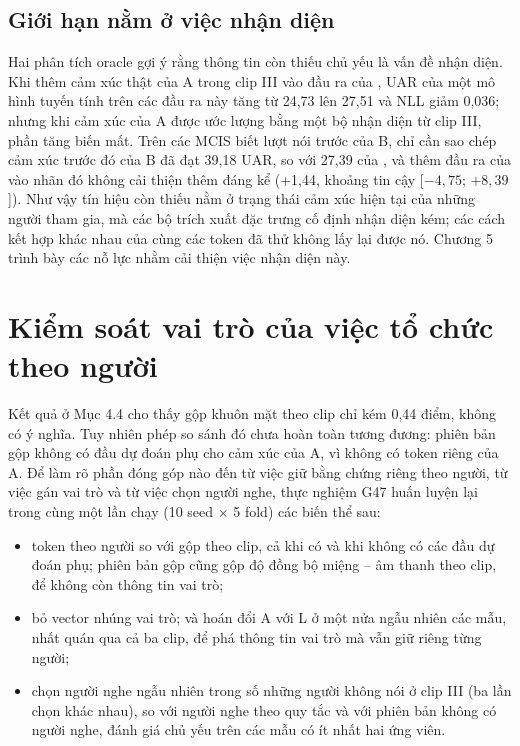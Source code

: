 \subsection{Giới hạn nằm ở việc nhận diện}

Hai phân tích oracle gợi ý rằng thông tin còn thiếu chủ yếu là vấn đề nhận diện. Khi thêm cảm xúc thật của A trong clip III vào đầu ra của \model{}, UAR của một mô hình tuyến tính trên các đầu ra này tăng từ 24,73 lên 27,51 và NLL giảm 0,036; nhưng khi cảm xúc của A được ước lượng bằng một bộ nhận diện từ clip III, phần tăng biến mất. Trên các MCIS biết lượt nói trước của B, chỉ cần sao chép cảm xúc trước đó của B đã đạt 39,18 UAR, so với 27,39 của \model{}, và thêm đầu ra của \model{} vào nhãn đó không cải thiện thêm đáng kể (+1,44, khoảng tin cậy [$-4{,}75$; $+8{,}39$]). Như vậy tín hiệu còn thiếu nằm ở trạng thái cảm xúc hiện tại của những người tham gia, mà các bộ trích xuất đặc trưng cố định nhận diện kém; các cách kết hợp khác nhau của cùng các token đã thử không lấy lại được nó. Chương 5 trình bày các nỗ lực nhằm cải thiện việc nhận diện này.

\section{Kiểm soát vai trò của việc tổ chức theo người}
\label{sec:g47}

Kết quả ở Mục 4.4 cho thấy gộp khuôn mặt theo clip chỉ kém \model{} 0,44 điểm, không có ý nghĩa. Tuy nhiên phép so sánh đó chưa hoàn toàn tương đương: phiên bản gộp không có đầu dự đoán phụ cho cảm xúc của A, vì không có token riêng của A. Để làm rõ phần đóng góp nào đến từ việc giữ bằng chứng riêng theo người, từ việc gán vai trò và từ việc chọn người nghe, thực nghiệm G47 huấn luyện lại trong cùng một lần chạy (10 seed $\times$ 5 fold) các biến thể sau:

\begin{itemize}
	\item token theo người so với gộp theo clip, cả khi có và khi không có các đầu dự đoán phụ; phiên bản gộp cũng gộp độ đồng bộ miệng -- âm thanh theo clip, để không còn thông tin vai trò;
	\item bỏ vector nhúng vai trò; và hoán đổi A với L ở một nửa ngẫu nhiên các mẫu, nhất quán qua cả ba clip, để phá thông tin vai trò mà vẫn giữ riêng từng người;
	\item chọn người nghe ngẫu nhiên trong số những người không nói ở clip III (ba lần chọn khác nhau), so với người nghe theo quy tắc và với phiên bản không có người nghe, đánh giá chủ yếu trên các mẫu có ít nhất hai ứng viên.
\end{itemize}

